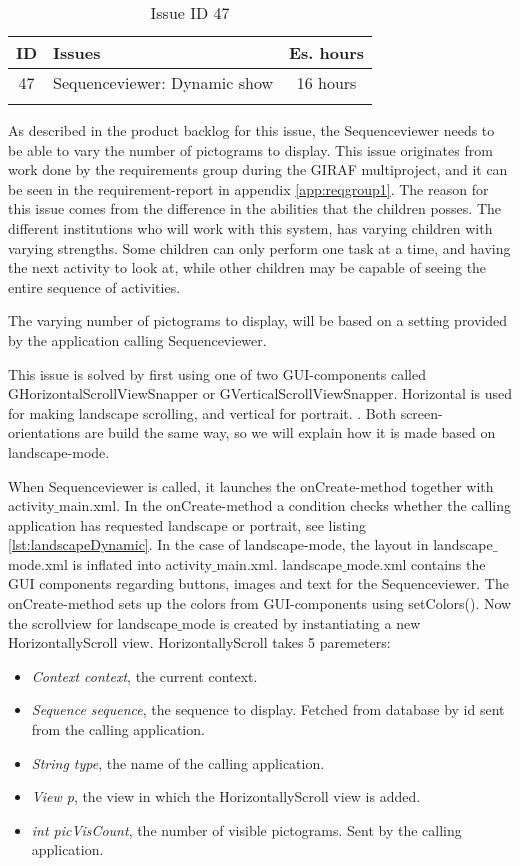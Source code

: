 \begin{longtable} { | c | p{12cm} | c | } 
\hline
	ID 	&	Issues	&		 Es. hours \\\hline
	 47	&	Sequenceviewer: Dynamic show	&	16 hours \\\hline
\caption{Issue ID 47}
\label{tab:spr3_SVdynamicshow}
\end{longtable}

As described in the product backlog for this issue, the Sequenceviewer needs to be able to vary the number of pictograms to display. This issue originates from work done by the requirements group during the GIRAF multiproject, and it can be seen in the requirement-report in appendix \ref{app:reqgroup1}. The reason for this issue comes from the difference in the abilities that the children posses. The different institutions who will work with this system, has varying children with varying strengths. Some children can only perform one task at a time, and having the next activity to look at, while other children may be capable of seeing the entire sequence of activities. 

The varying number of pictograms to display, will be based on a setting provided by the application calling Sequenceviewer.

This issue is solved by first using one of two GUI-components called GHorizontalScrollViewSnapper or GVerticalScrollViewSnapper. Horizontal is used for making landscape scrolling, and vertical for portrait. . Both screen-orientations are build the same way, so we will explain how it is made based on landscape-mode. 

When Sequenceviewer is called, it launches the onCreate-method together with activity$\_$main.xml. In the onCreate-method a condition checks whether the calling application has requested landscape or portrait, see listing \ref{lst:landscapeDynamic}. In the case of landscape-mode, the layout in landscape$\_$mode.xml is inflated into activity$\_$main.xml. landscape$\_$mode.xml contains the GUI components regarding buttons, images and text for the Sequenceviewer. The onCreate-method sets up the colors from GUI-components using setColors(). Now the scrollview for landscape$\_$mode is created by instantiating a new HorizontallyScroll view. HorizontallyScroll takes 5 paremeters:
\begin{itemize}
\item \textit{Context context}, the current context.
\item \textit{Sequence sequence}, the sequence to display. Fetched from database by id sent from the calling application.
\item \textit{String type}, the name of the calling application.
\item \textit{View p}, the view in which the HorizontallyScroll view is added.
\item \textit{int picVisCount}, the number of visible pictograms. Sent by the calling application.
\end{itemize}

